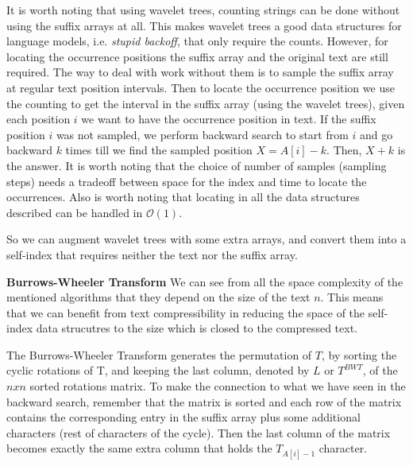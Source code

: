 \documentclass[11pt]{article}
\begin{document}
It is worth noting that using wavelet trees, counting strings can be done without using the suffix arrays at all. This makes wavelet trees a good data structures for language models, i.e. \emph{stupid backoff}, that only require the counts. However, for locating the occurrence positions the suffix array and the original text are still required. The way to deal with work without them is to sample the suffix array at regular text position intervals. Then to locate the occurrence position we use the counting to get the interval in the suffix array (using the wavelet trees), given each position $i$ we want to have the occurrence position in text. If the suffix position $i$ was not sampled, we perform backward search to start from $i$ and go backward $k$ times till we find the sampled position $X = A[i]-k$. Then, $X+k$ is the answer. It is worth noting that the choice of number of samples (sampling steps) needs a tradeoff between space for the index and time to locate the occurrences. Also is worth noting that locating in all the data structures described can be handled in $\mathcal{O}(1)$. 

So we can augment wavelet trees with some extra arrays, and convert them into a self-index that requires neither the text nor the suffix array. 

\textbf{Burrows-Wheeler Transform} We can see from all the space complexity of the mentioned algorithms that they depend on the size of the text $n$. This means that we can benefit from text compressibility in reducing the space of the self-index data strucutres to the size which is closed to the compressed text.
 
The Burrows-Wheeler Transform generates the permutation of $T$, by sorting the cyclic rotations of T, and keeping the last column, denoted by $L$ or $T^{BWT}$, of the $nxn$ sorted rotations matrix. To make the connection to what we have seen in the backward search, remember that the matrix is sorted and each row of the matrix contains the corresponding entry in the suffix array plus some additional characters (rest of characters of the cycle). Then the last column of the matrix becomes exactly the same extra column that holds the $T_{A[i]-1}$ character. 
\end{document}
